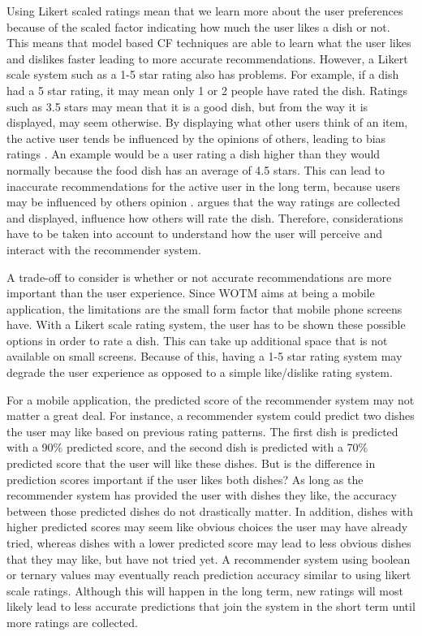 Using Likert scaled ratings mean that we learn more about the user preferences because of the scaled factor indicating how much the user likes a dish or not. This means that model based CF techniques are able to learn what the user likes and dislikes faster leading to more accurate recommendations. However, a Likert scale system such as a 1-5 star rating also has problems. For example, if a dish had a 5 star rating, it may mean only 1 or 2 people have rated the dish. Ratings such as 3.5 stars may mean that it is a good dish, but from the way it is displayed, may seem otherwise. By displaying what other users think of an item, the active user tends be influenced by the opinions of others, leading to bias ratings \cite{interface}. An example would be a user rating a dish higher than they would normally because the food dish has an average of 4.5 stars. This can lead to inaccurate recommendations for the active user in the long term, because users may be influenced by others opinion \cite{interface}. \citeauthor{interface} \cite{interface} argues that the way ratings are collected and displayed, influence how others will rate the dish. Therefore, considerations have to be taken into account to understand how the user will perceive and interact with the recommender system.  

A trade-off to consider is whether or not accurate recommendations are more important than the user experience. Since WOTM aims at being a mobile application, the limitations are the small form factor that mobile phone screens have. With a Likert scale rating system, the user has to be shown these possible options in order to rate a dish. This can take up additional space that is not available on small screens. Because of this, having a 1-5 star rating system may degrade the user experience as opposed to a simple like/dislike rating system. 

For a mobile application, the predicted score of the recommender system may not matter a great deal. For instance, a recommender system could predict two dishes the user may like based on previous rating patterns. The first dish is predicted with a 90\% predicted score, and the second dish is predicted with a 70\% predicted score that the user will like these dishes. But is the difference in prediction scores important if the user likes both dishes? As long as the recommender system has provided the user with dishes they like, the accuracy between those predicted dishes do not drastically matter. In addition, dishes with higher predicted scores may seem like obvious choices the user may have already tried, whereas dishes with a lower predicted score may lead to less obvious dishes that they may like, but have not tried yet. A recommender system using boolean or ternary values may eventually reach prediction accuracy similar to using likert scale ratings. Although this will happen in the long term, new ratings will most likely lead to less accurate predictions that join the system in the short term until more ratings are collected. 

